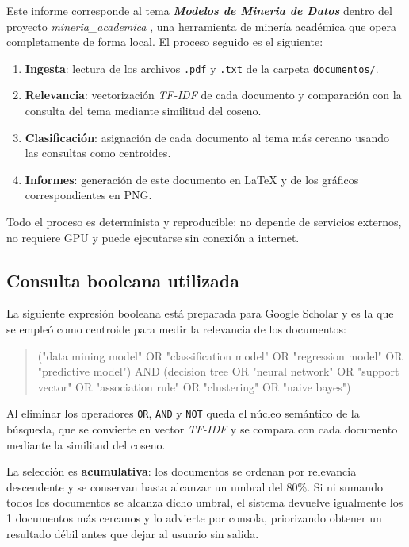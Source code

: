 \documentclass[11pt,a4paper]{article}
\newcommand{\tema}[1]{\textbf{\textit{#1}}}
\newcommand{\pcento}{\%}
\begin{document}
Este informe corresponde al tema \tema{ Modelos de Mineria de Datos } dentro del
proyecto \textit{ mineria\_academica }, una herramienta de minería académica que
opera completamente de forma local. El proceso seguido es el siguiente:

\begin{enumerate}
  \item \textbf{Ingesta}: lectura de los archivos \texttt{.pdf} y
        \texttt{.txt} de la carpeta \texttt{documentos/}.
  \item \textbf{Relevancia}: vectorización \textit{TF-IDF} de cada documento
        y comparación con la consulta del tema mediante similitud del coseno.
  \item \textbf{Clasificación}: asignación de cada documento al tema más
        cercano usando las consultas como centroides.
  \item \textbf{Informes}: generación de este documento en \LaTeX{} y de los
        gráficos correspondientes en PNG.
\end{enumerate}

Todo el proceso es determinista y reproducible: no depende de servicios
externos, no requiere GPU y puede ejecutarse sin conexión a internet.

\subsection{Consulta booleana utilizada}
\label{sec:query}

La siguiente expresión booleana está preparada para Google Scholar y es la que
se empleó como centroide para medir la relevancia de los documentos:

\begin{quote}
\small\ttfamily
("data mining model" OR "classification model" OR "regression model" OR "predictive model") AND (decision tree OR "neural network" OR "support vector" OR "association rule" OR "clustering" OR "naive bayes")
\end{quote}

Al eliminar los operadores \texttt{OR}, \texttt{AND} y \texttt{NOT} queda el
núcleo semántico de la búsqueda, que se convierte en vector \textit{TF-IDF} y
se compara con cada documento mediante la similitud del coseno.

La selección es \textbf{acumulativa}: los documentos se ordenan por relevancia
descendente y se conservan hasta alcanzar un umbral del
80\pcento. Si ni sumando todos los documentos se alcanza
dicho umbral, el sistema devuelve igualmente los 1
documentos más cercanos y lo advierte por consola, priorizando obtener un
resultado débil antes que dejar al usuario sin salida.
\end{document}
